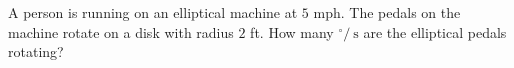 A person is running on an elliptical machine at $5$ mph. The pedals on the machine rotate on a disk with radius $2$ ft. How many ${}^{\circ} /\ \text{s}$ are the elliptical pedals rotating?

